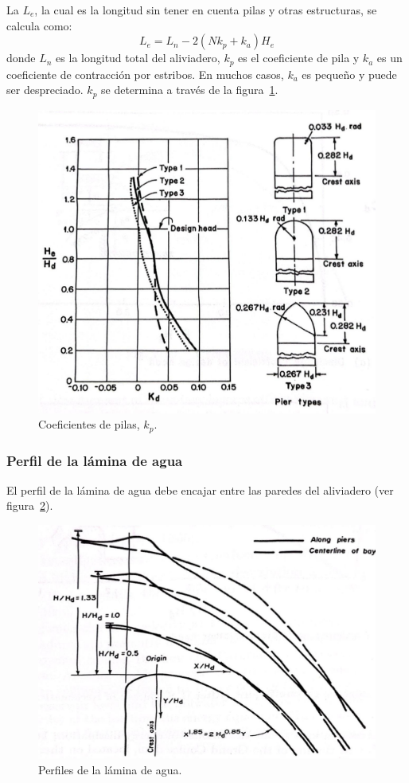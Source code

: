\documentclass[11pt, oneside]{article}
\begin{document}
La $L_e$, la cual es la longitud sin tener en cuenta pilas y otras estructuras, se calcula como:
\begin{equation}
    L_e = L_n - 2\left( N k_p + k_a \right) H_e 
    \label{eq27}
\end{equation}
donde $L_n$ es la longitud total del aliviadero, $k_p$ es el coeficiente de pila y $k_a$ es un coeficiente de contracci\'on por estribos. En muchos casos, $k_a$ es pequeño y puede ser despreciado. $k_p$ se determina a trav\'es de la figura~\ref{fig721}.
\begin{figure}[h]
    \centering
    \includegraphics[width=0.8\linewidth]{fig721.jpeg}
    \caption{Coeficientes de pilas, $k_p$.}
    \label{fig721}
\end{figure}

\subsubsection{Perfil de la l\'amina de agua}
El perfil de la l\'amina de agua debe encajar entre las paredes del aliviadero (ver figura~\ref{fig722}).
\begin{figure}[h]
    \centering
    \includegraphics[width=0.8\linewidth]{fig722.jpeg}
    \caption{Perfiles de la l\'amina de agua.}
    \label{fig722}
\end{figure}
\end{document}

